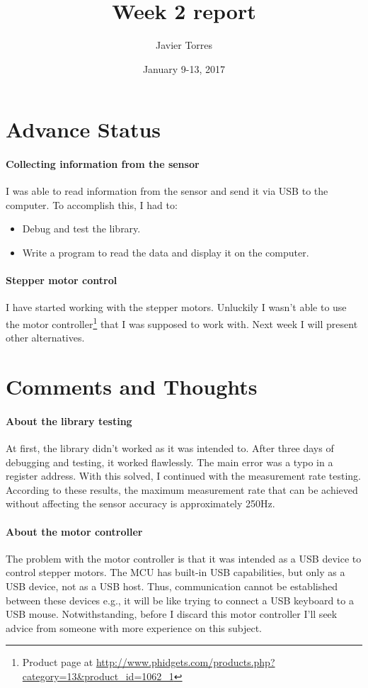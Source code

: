 \documentclass{article}
\title{Week 2 report}
\author{Javier Torres}
\date{January 9-13, 2017}
\begin{document}
\maketitle

\tableofcontents

\section{Advance Status}

\paragraph{Collecting information from the sensor}
I was able to read information from the sensor and send it via USB to the computer. To accomplish this, I had to:
\begin{itemize}
    \item Debug and test the library.
    \item Write a program to read the data and display it on the computer.
\end{itemize}

\paragraph{Stepper motor control}
I have started working with the stepper motors. Unluckily I wasn't able to use the motor controller\footnote{Product page at \url{http://www.phidgets.com/products.php?category=13&product_id=1062_1}} that I was supposed to work with. Next week I will present other alternatives.

\section{Comments and Thoughts}
\paragraph{About the library testing}
At first, the library didn't worked as it was intended to. After three days of debugging and testing, it worked flawlessly. The main error was a typo in a register address. With this solved, I continued with the measurement rate testing. According to these results, the maximum measurement rate that can be achieved without affecting the sensor accuracy is approximately 250Hz.
\paragraph{About the motor controller}
The problem with the motor controller is that it was intended as a USB device to control stepper motors. The MCU has built-in USB capabilities, but only as a USB device, not as a USB host. Thus, communication cannot be established between these devices e.g., it will be like trying to connect a USB keyboard to a USB mouse. Notwithstanding, before I discard this motor controller I'll seek advice from someone with more experience on this subject.
\end{document}
